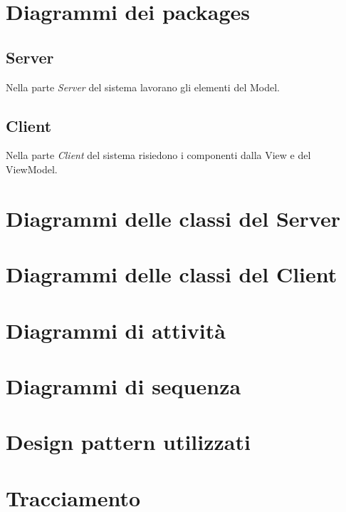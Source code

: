 \documentclass[a4paper,11pt]{article}
\begin{document}
		
	
	
	
	
	\section{Diagrammi dei packages}
		\subsection{Server}
		Nella parte \emph{Server} del sistema lavorano gli elementi del Model.
			
		\subsection{Client}
		Nella parte \emph{Client} del sistema risiedono i componenti dalla View e del ViewModel.
			
			
	
	\section{Diagrammi delle classi del Server}
		
	\section{Diagrammi delle classi del Client}
		
		
	
	\section{Diagrammi di attività}
		
	\section{Diagrammi di sequenza}
		
	\section{Design pattern utilizzati}
		
	
	\section{Tracciamento}
		
		
	
\end{document}
